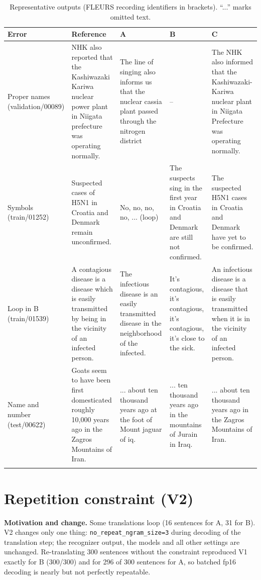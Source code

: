 \documentclass[pdflatex,sn-mathphys-num]{sn-jnl}
\begin{document}
\begin{table}[t]
\caption{Representative outputs (FLEURS recording identifiers in brackets). ``...'' marks omitted text.}\label{tab:examples}
\begin{tabular}{@{}p{1.6cm}p{2.5cm}p{2.0cm}p{2.0cm}p{2.0cm}@{}}
\toprule
Error & Reference & A & B & C\\
\midrule
Proper names (validation/00089) & NHK also reported that the Kashiwazaki Kariwa nuclear power plant in Niigata prefecture was operating normally. & The line of singing also informs us that the nuclear cassia plant passed through the nitrogen district & -- & The NHK also informed that the Kashiwazaki-Kariwa nuclear plant in Niigata Prefecture was operating normally.\\
\midrule
Symbols (train/01252) & Suspected cases of H5N1 in Croatia and Denmark remain unconfirmed. & No, no, no, no, ... (loop) & The suspects sing in the first year in Croatia and Denmark are still not confirmed. & The suspected H5N1 cases in Croatia and Denmark have yet to be confirmed.\\
\midrule
Loop in B (train/01539) & A contagious disease is a disease which is easily transmitted by being in the vicinity of an infected person. & The infectious disease is an easily transmitted disease in the neighborhood of the infected. & It's contagious, it's contagious, it's contagious, it's close to the sick. & An infectious disease is a disease that is easily transmitted when it is in the vicinity of an infected person.\\
\midrule
Name and number (test/00622) & Goats seem to have been first domesticated roughly 10,000 years ago in the Zagros Mountains of Iran. & ... about ten thousand years ago at the foot of Mount jaguar of iq. & ... ten thousand years ago in the mountains of Jurain in Iraq. & ... about ten thousand years ago in the Zagros Mountains of Iran.\\
\botrule
\end{tabular}
\end{table}

\section{Repetition constraint (V2)}\label{sec:v2}

\textbf{Motivation and change.} Some translations loop (16 sentences for A, 31 for B). V2 changes only one thing: \texttt{no\_repeat\_ngram\_size=3} during decoding of the translation step; the recognizer output, the models and all other settings are unchanged. Re-translating 300 sentences without the constraint reproduced V1 exactly for B (300/300) and for 296 of 300 sentences for A, so batched fp16 decoding is nearly but not perfectly repeatable.
\end{document}
